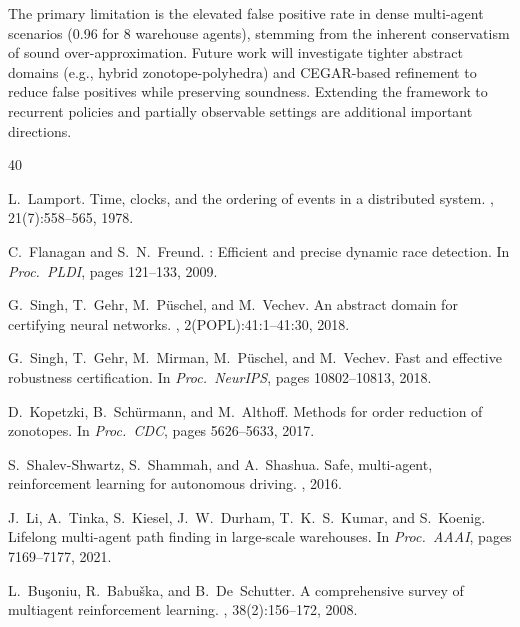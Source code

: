 \documentclass[11pt]{article}
\begin{document}
The primary limitation is the elevated false positive rate in dense
multi-agent scenarios (0.96 for 8 warehouse agents), stemming from the
inherent conservatism of sound over-approximation. Future work will
investigate tighter abstract domains (e.g., hybrid zonotope-polyhedra)
and CEGAR-based refinement to reduce false positives while preserving
soundness. Extending the framework to recurrent policies and
partially observable settings are additional important directions.


\begin{thebibliography}{40}

L.~Lamport.
\newblock Time, clocks, and the ordering of events in a distributed system.
, 21(7):558--565, 1978.

C.~Flanagan and S.~N.~Freund.
: Efficient and precise dynamic race detection.
\newblock In {\em Proc.\ PLDI}, pages 121--133, 2009.

G.~Singh, T.~Gehr, M.~P\"{u}schel, and M.~Vechev.
\newblock An abstract domain for certifying neural networks.
, 2(POPL):41:1--41:30, 2018.

G.~Singh, T.~Gehr, M.~Mirman, M.~P\"{u}schel, and M.~Vechev.
\newblock Fast and effective robustness certification.
\newblock In {\em Proc.\ NeurIPS}, pages 10802--10813, 2018.

D.~Kopetzki, B.~Sch\"{u}rmann, and M.~Althoff.
\newblock Methods for order reduction of zonotopes.
\newblock In {\em Proc.\ CDC}, pages 5626--5633, 2017.

S.~Shalev-Shwartz, S.~Shammah, and A.~Shashua.
\newblock Safe, multi-agent, reinforcement learning for autonomous driving.
, 2016.

J.~Li, A.~Tinka, S.~Kiesel, J.~W.~Durham, T.~K.~S.~Kumar, and S.~Koenig.
\newblock Lifelong multi-agent path finding in large-scale warehouses.
\newblock In {\em Proc.\ AAAI}, pages 7169--7177, 2021.

L.~Bu\c{s}oniu, R.~Babu\v{s}ka, and B.~De~Schutter.
\newblock A comprehensive survey of multiagent reinforcement learning.
, 38(2):156--172, 2008.


\end{thebibliography}
\end{document}

